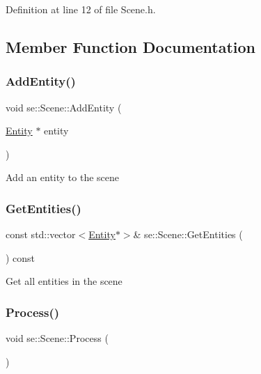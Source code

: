 Definition at line 12 of file Scene.\+h.



\subsection{Member Function Documentation}
\mbox{\label{classse_1_1_scene_a21dde7d731d672d4c424397850864549}} 
\subsubsection{\texorpdfstring{Add\+Entity()}{AddEntity()}}
{\footnotesize\ttfamily void se\+::\+Scene\+::\+Add\+Entity (\begin{DoxyParamCaption}\item[{\mbox{\hyperlink{classse_1_1_entity}{Entity}} $\ast$}]{entity }\end{DoxyParamCaption})}

Add an entity to the scene \mbox{\label{classse_1_1_scene_a1c3f1fc4ab110f9caab190cce13c2e03}} 
\subsubsection{\texorpdfstring{Get\+Entities()}{GetEntities()}}
{\footnotesize\ttfamily const std\+::vector$<$\mbox{\hyperlink{classse_1_1_entity}{Entity}}$\ast$$>$\& se\+::\+Scene\+::\+Get\+Entities (\begin{DoxyParamCaption}{ }\end{DoxyParamCaption}) const}

Get all entities in the scene \mbox{\label{classse_1_1_scene_ade05c94ef257fef17c7f4979009f4995}} 
\subsubsection{\texorpdfstring{Process()}{Process()}}
{\footnotesize\ttfamily void se\+::\+Scene\+::\+Process (\begin{DoxyParamCaption}{ }\end{DoxyParamCaption})}

